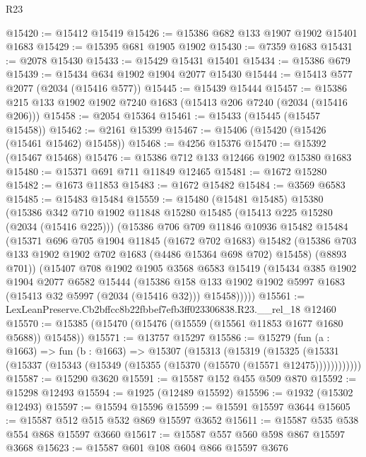 \begin{lexlean}{R23}
\begin{coremodule}
@15420 := @15412 @15419
@15426 := @15386 @682 @133 @1907 @1902 @15401 @1683
@15429 := @15395 @681 @1905 @1902
@15430 := @7359 @1683
@15431 := @2078 @15430
@15433 := @15429 @15431 @15401
@15434 := @15386 @679
@15439 := @15434 @634 @1902 @1904 @2077 @15430
@15444 := @15413 @577 @2077 (@2034 (@15416 @577))
@15445 := @15439 @15444
@15457 := @15386 @215 @133 @1902 @1902 @7240 @1683 (@15413 @206 @7240 (@2034 (@15416 @206)))
@15458 := @2054 @15364
@15461 := @15433 (@15445 (@15457 @15458))
@15462 := @2161 @15399
@15467 := @15406 (@15420 (@15426 (@15461 @15462) @15458))
@15468 := @4256 @15376
@15470 := @15392 (@15467 @15468)
@15476 := @15386 @712 @133 @12466 @1902 @15380 @1683
@15480 := @15371 @691 @711 @11849 @12465
@15481 := @1672 @15280
@15482 := @1673 @11853
@15483 := @1672 @15482
@15484 := @3569 @6583
@15485 := @15483 @15484
@15559 := @15480
    (@15481 @15485)
    @15380
    (@15386
      @342
      @710
      @1902
      @11848
      @15280
      @15485
      (@15413 @225 @15280 (@2034 (@15416 @225)))
      (@15386
        @706
        @709
        @11846
        @10936
        @15482
        @15484
        (@15371
          @696
          @705
          @1904
          @11845
          (@1672 @702 @1683)
          @15482
          (@15386 @703 @133 @1902 @1902 @702 @1683 (@4486 @15364 @698 @702) @15458)
          (@8893 @701))
        (@15407
          @708
          @1902
          @1905
          @3568
          @6583
          @15419
          (@15434
            @385
            @1902
            @1904
            @2077
            @6582
            @15444
            (@15386
              @158
              @133
              @1902
              @1902
              @5997
              @1683
              (@15413 @32 @5997 (@2034 (@15416 @32)))
              @15458)))))
@15561 := LexLeanPreserve.Cb2bffcc8b22fbbef7efb3ff023306838.R23.__rel_18 @12460
@15570 := @15385 (@15470 (@15476 (@15559 (@15561 @11853 @1677 @1680 @5688)) @15458))
@15571 := @13757 @15297
@15586 := @15279
    (fun (a : @1663) =>
    fun (b : @1663) =>
    @15307
      (@15313
        (@15319
          (@15325 (@15331 (@15337 (@15343 (@15349 (@15355 (@15370 (@15570 (@15571 @12475))))))))))))
@15587 := @15290 @3620
@15591 := @15587 @152 @455 @509 @870
@15592 := @15298 @12493
@15594 := @1925 (@12489 @15592)
@15596 := @1932 (@15302 @12493)
@15597 := @15594 @15596
@15599 := @15591 @15597 @3644
@15605 := @15587 @512 @515 @532 @869 @15597 @3652
@15611 := @15587 @535 @538 @554 @868 @15597 @3660
@15617 := @15587 @557 @560 @598 @867 @15597 @3668
@15623 := @15587 @601 @108 @604 @866 @15597 @3676

\end{coremodule}
\end{lexlean}
